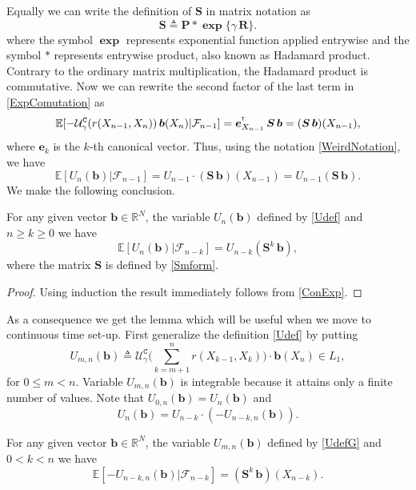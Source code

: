 Equally we can write the definition of $\bm{S}$ in matrix notation as
\begin{equation}
\label{Smform}
\bm{S}\triangleq\bm{P}\ast\bm{\exp}\{\gamma\,\bm{R}\}.
\end{equation}
where the symbol $\bm{\exp}$ represents exponential function applied entrywise and the symbol $\ast$ represents entrywise product, also known as Hadamard product. Contrary to the ordinary matrix multiplication, the Hadamard product is commutative. Now we can rewrite the second factor of the last term in \eqref{ExpComutation} as
\begin{equation}
\mathbb{E}[-\mathcal{U}_{\gamma}^{\texttt{C}}(r(X_{n-1},X_n))\,\mbox{\boldmath{$b$}}(X_n)|\mathcal{F}_{n-1}]=\mbox{\boldmath{$e$}}_{X_{n-1}}^{^{_\texttt T}}\,\mbox{\boldmath{$S$}}\,\mbox{\boldmath{$b$}}=(\mbox{\boldmath{$S$}}\,\mbox{\boldmath{$b$}})(X_{n-1}),
\end{equation}
where $\bm{e}_k$ is the $k$-th canonical vector. Thus, using the notation \eqref{WeirdNotation}, we have 
\begin{equation}
\label{ConExp}
\mathbb{E}[U_n(\bm{b})|\mathcal{F}_{n-1}]=U_{n-1}\cdot(\bm{S}\,\bm{b})(X_{n-1})=U_{n-1}(\bm{S}\,\bm{b}).
\end{equation}
We make the following conclusion.
\begin{prop}
\label{prop1}
For any given vector $\bm{b}\in\mathbb{R}^N$, the variable $U_{n}(\bm{b})$ defined by \eqref{Udef} and $n\geq k\geq0$ we have 
$$\mathbb{E}[U_n(\bm{b})|\mathcal{F}_{n-k}]=U_{n-k}(\bm{S}^k\,\bm{b}),$$
where the matrix $\bm{S}$ is defined by \eqref{Smform}.
\end{prop}
\begin{proof}
Using induction the result immediately follows from \eqref{ConExp}.
\end{proof}
\noindent As a consequence we get the lemma which will be useful when we move to continuous time set-up. First generalize the definition \eqref{Udef} by putting
\begin{equation}
\label{UdefG}
U_{m,n}(\bm{b})\triangleq\mathcal{U}_{\gamma}^{\texttt{C}}\Big(\sum_{k=m+1}^n r(X_{k-1},X_k)\Big)\cdot\bm{b}(X_n)\in L_1,
\end{equation}
for $0\leq m<n$. Variable $U_{m,n}(\bm{b})$ is integrable because it attains only a finite number of values. Note that $U_{0,n}(\bm{b})=U_n(\bm{b})$ and 
\[U_{n}(\bm{b})=U_{n-k}\cdot(-U_{n-k,n}(\bm{b})).\] 
\begin{lem}
\label{LemmaSum}
For any given vector $\bm{b}\in\mathbb{R}^N$, the variable $U_{m,n}(\bm{b})$ defined by \eqref{UdefG} and $0<k<n$ we have
\[\mathbb{E}[-U_{n-k,n}(\bm{b})|\mathcal{F}_{n-k}]=(\bm{S}^k\,\bm{b})(X_{n-k}).\]
\end{lem}
